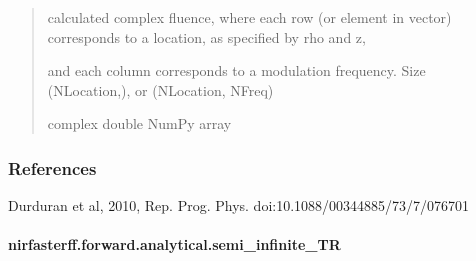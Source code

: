 \documentclass[letterpaper,10pt,english]{sphinxmanual}
\begin{document}
\begin{fulllineitems}
\begin{quote}
\begin{description}
\sphinxAtStartPar

\sphinxAtStartPar
calculated complex fluence, where each row (or element in vector) corresponds to a location, as specified by rho and z,

\sphinxAtStartPar
and each column corresponds to a modulation frequency. Size (NLocation,), or (NLocation, NFreq)


\sphinxAtStartPar
complex double NumPy array

\end{description}\end{quote}
\subsubsection*{References}

\sphinxAtStartPar
Durduran et al, 2010, Rep. Prog. Phys. doi:10.1088/0034\sphinxhyphen{}4885/73/7/076701

\end{fulllineitems}


\sphinxstepscope


\paragraph{nirfasterff.forward.analytical.semi\_infinite\_TR}
\label{\detokenize{_autosummary/nirfasterff.forward.analytical.semi_infinite_TR:nirfasterff-forward-analytical-semi-infinite-tr}}\label{\detokenize{_autosummary/nirfasterff.forward.analytical.semi_infinite_TR::doc}}
\end{document}
